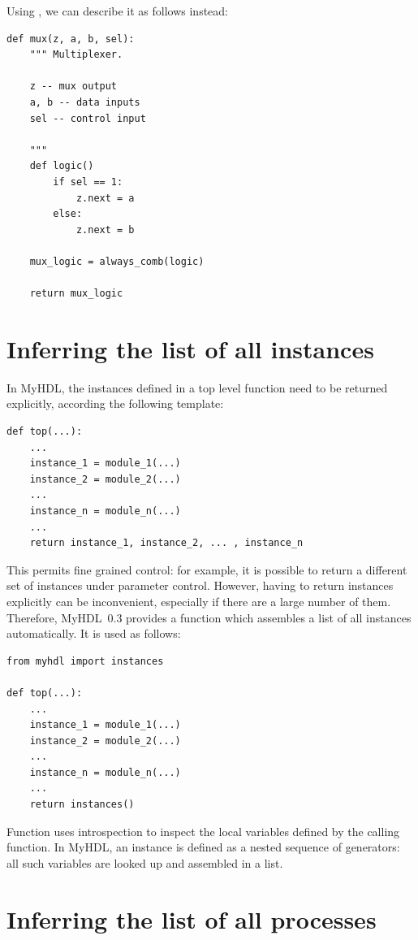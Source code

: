 \documentclass{howto}
\newcommand{\myhdl}{\protect \mbox{MyHDL}}
\begin{document}
Using , we can describe it as follows instead:

\begin{verbatim}
def mux(z, a, b, sel):
    """ Multiplexer.
    
    z -- mux output
    a, b -- data inputs
    sel -- control input

    """
    def logic()
        if sel == 1:
            z.next = a
        else:
            z.next = b

    mux_logic = always_comb(logic)

    return mux_logic
\end{verbatim}


\section{Inferring the list of all instances\label{section-instances}}

In \myhdl{}, the instances defined in a top level function
need to be returned explicitly, according
the following template:

\begin{verbatim}
def top(...):
    ...
    instance_1 = module_1(...)
    instance_2 = module_2(...)
    ...
    instance_n = module_n(...)
    ... 
    return instance_1, instance_2, ... , instance_n
\end{verbatim}


This permits fine grained control: for example, it
is possible to return a different set of instances
under parameter control. 
However, having to return instances explicitly can be inconvenient,
especially if there are a large number of them. Therefore, \myhdl\ 0.3
provides a function  which assembles a list of
all instances automatically. It is used as follows:

\begin{verbatim}
from myhdl import instances

def top(...):
    ...
    instance_1 = module_1(...)
    instance_2 = module_2(...)
    ...
    instance_n = module_n(...)
    ...
    return instances()
\end{verbatim}

Function  uses introspection to
inspect the local variables defined by the calling
function. In \myhdl {}, an instance is defined as
a nested sequence of generators: all such variables
are looked up and assembled in a list.

\section{Inferring the list of all processes\label{section-processes}}
\end{document}
